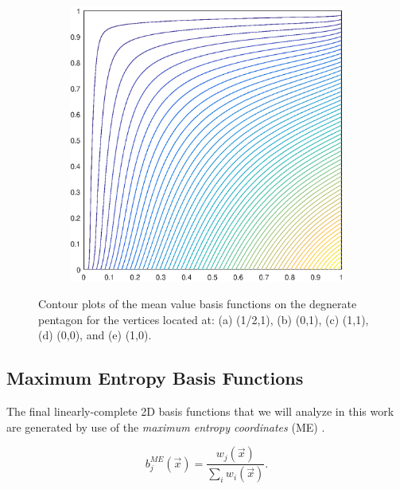 \begin{figure}
\begin{subfigure}[b]{0.35\textwidth}
		\caption{}
	\end{subfigure}
	\hspace{1cm}
	\begin{subfigure}[b]{0.35\textwidth}
		\centering
		\includegraphics[width=\textwidth]{figures/sec_BF/deg_square_MV1_contour_b2.eps}
		\caption{}
	\end{subfigure}
\caption{Contour plots of the mean value basis functions on the degnerate pentagon for the vertices located at: (a) (1/2,1), (b) (0,1), (c) (1,1), (d) (0,0), and (e) (1,0).}
\end{figure}

\subsection{Maximum Entropy Basis Functions}
\label{sec::BF_2DLinear_ME}

The final linearly-complete 2D basis functions that we will analyze in this work are generated by use of the {\em maximum entropy coordinates} (ME) \cite{sukumar2004construction,arroyo2006local,hormann2008maximum}. 

\begin{equation}
\label{eq::BF_ME_BF}
b_{j}^{ME} (\vec{x}) = \frac{w_j (\vec{x}) }{\sum_i w_i (\vec{x})} .
\end{equation}

